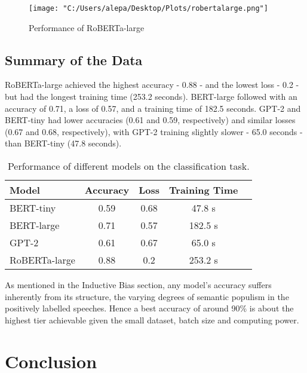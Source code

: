 \documentclass[11pt,twocolumn,letterpaper]{article}
\begin{document}
\begin{figure}[h]
	\centering
	\texttt{[image: "C:/Users/alepa/Desktop/Plots/robertalarge.png"]}
	\caption{Performance of RoBERTa-large}
	\label{fig:roberta-large}
\end{figure}


\subsection{Summary of the Data}

RoBERTa-large achieved the highest accuracy - 0.88 - and the lowest loss - 0.2 - but had the longest training time (253.2 seconds). BERT-large followed with an accuracy of 0.71, a loss of 0.57, and a training time of 182.5 seconds. GPT-2 and BERT-tiny had lower accuracies (0.61 and 0.59, respectively) and similar losses (0.67 and 0.68, respectively), with GPT-2 training slightly slower - 65.0 seconds - than BERT-tiny (47.8 seconds).

\begin{table}[H]
\begin{center}
\begin{tabular}{|l|c|c|c|c|}
\hline
Model & Accuracy & Loss & Training Time\\
\hline\hline
BERT-tiny & 0.59 & 0.68 & 47.8 s\\
BERT-large & 0.71 & 0.57 & 182.5 s\\
GPT-2 & 0.61 & 0.67 & 65.0 s\\
RoBERTa-large & 0.88 & 0.2 & 253.2 s\\
\hline
\end{tabular}
\end{center}
\caption{Performance of different models on the classification task.}
\label{Table_2}
\end{table}

As mentioned in the Inductive Bias section, any model's accuracy suffers inherently from its structure, the varying degrees of semantic populism in the positively labelled speeches. Hence a best accuracy of around 90\% is about the highest tier achievable given the small dataset, batch size and computing power.

\section{Conclusion}
\end{document}

